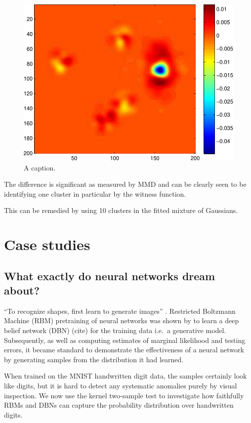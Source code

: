 \documentclass{article} %
\def\ie{i.e.\ }
\begin{document}
\begin{figure}[ht]
\centering
\includegraphics[width=0.98\columnwidth]{figures/high_mog_witness}
\caption{
A caption.
}
\label{fig:high_mog_fa}
\end{figure}

The difference is significant as measured by MMD and can be clearly seen to be identifying one cluster in particular by the witness function.

This can be remedied by using 10 clusters in the fitted mixture of Gaussians.

\section{Case studies}

\subsection{What exactly do neural networks dream about?}

``To recognize shapes, first learn to generate images'' \cite{Hinton2007}.
Restricted Boltzmann Machine (RBM) pretraining of neural networks was shown by \cite{Hinton2006} to learn a deep belief network (DBN) (cite) for the training data \ie a generative model.
Subsequently, as well as computing estimates of marginal likelihood and testing errors, it became standard to demonstrate the effectiveness of a neural network by generating samples from the distribution it had learned.

When trained on the MNIST handwritten digit data, the samples certainly look like digits, but it is hard to detect any systematic anomalies purely by visual inspection.
We now use the kernel two-sample test to investigate how faithfully RBMs and DBNs can capture the probability distribution over handwritten digits.
\end{document}
